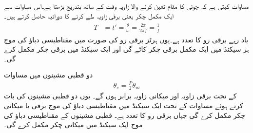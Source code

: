 مساوات   کہتی ہے  کہ چوٹی کا مقام تعین کرنے والا زاویہ وقت کے ساتھ  بتدریج بڑھتا  ہے۔اس مساوات سے  ایک مکمل چکر یعنی   برقی زاویہ طے کرنے   کا دورانیہ  حاصل کرتے ہیں۔
\begin{gather}
\begin{aligned}\label{مساوات_گھومتے_مشین_دوری_وقفہ}
T&=t'=\frac{\theta}{\omega}=\frac{2\pi}{2\pi f}=\frac{1}{f}
\end{aligned}
\end{gather}
یاد رہے  برقی رو کا تعدد ہے۔یوں  ہرٹز برقی رو کی صورت میں مقناطیسی دباؤ کی موج ہر  سیکنڈ میں ایک مکمل برقی چکر کاٹے گی اور ایک سیکنڈ میں  برقی چکر مکمل کرے گی۔

دو قطبی مشینوں میں مساوات 
\begin{align}\label{مساوات_بنیادی_اصول_زاویات_برقی_میکانی}
\theta_e=\frac{P}{2} \theta_m
\end{align}
 کے تحت  برقی زاویہ   اور میکانی زاویہ  برابر ہوں گے۔ یوں دو قطبی مشینوں کی بات کرتے ہوئے  مساوات   کے تحت ایک سیکنڈ میں مقناطیسی دباؤ کی موج  برقی یا میکانی چکر مکمل کرے  گی جہاں  برقی رو کا  تعدد ہے۔   قطبی مشینوں  کے مقناطیسی دباؤ کی موج ایک سیکنڈ میں  میکانی چکر مکمل کرے گی۔

